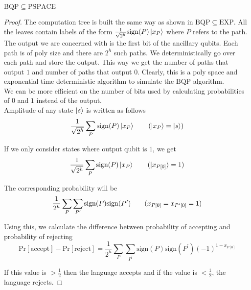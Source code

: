 \documentclass[../main.tex]{subfiles}
\begin{document}
\begin{theorem}
$\mathrm{BQP}\subseteq\mathrm{PSPACE}$ \cite{ADH97}
\end{theorem}
\begin{proof}
The computation tree is built the same way as shown in $\mathrm{BQP}\subseteq\mathrm{EXP}$. All the leaves contain labels of the form $\frac{1}{\sqrt{2^h}}\mathrm{sign}(P)\ket{x_P}$ where $P$ refers to the path.\\

\noindent The output we are concerned with is the first bit of the ancillary qubits. Each path is of poly size and there are $2^h$ such paths. We deterministically go over each path and store the output. This way we get the number of paths that output $1$ and number of paths that output $0$. Clearly, this is a poly space and exponential time deterministic algorithm to simulate the $\mathrm{BQP}$ algorithm.\\

\noindent We can be more efficient on the number of bits used by calculating probabilities of $0$ and $1$ instead of the output.\\

\noindent Amplitude of any state $\ket{s}$ is written as follows
\begin{equation*}
    \frac{1}{\sqrt{2^h}}\sum_P\mathrm{sign}(P)\ket{x_P} \tag{$\ket{x_P} = \ket{s}$}
\end{equation*}

\noindent If we only consider states where output qubit is $1$, we get
\begin{equation*}
    \frac{1}{\sqrt{2^h}}\sum_P\mathrm{sign}(P)\ket{x_P} \tag{$\ket{x_{P[0]}} = 1$}
\end{equation*}

\noindent The corresponding probability will be
\begin{equation*}
    \frac{1}{2^h}\sum_P\sum_{P^\prime}\mathrm{sign}(P)\mathrm{sign}(P^\prime)\tag{$x_{P[0]}=x_{P^\prime[0]}=1$}
\end{equation*}

\noindent Using this, we calculate the difference between probability of accepting and probability of rejecting
\begin{equation*}
    \mathrm{Pr[accept]}-\mathrm{Pr[reject]} = \frac{1}{2^h}\sum_P\sum_{P^\prime}\mathrm{sign}(P)\mathrm{sign}(P^\prime)(-1)^{1-x_{P[0]}}
\end{equation*}

\noindent If this value is $>\frac{1}{2}$ then the language accepts and if the value is $<\frac{1}{2}$, the language rejects.
\end{proof}
\end{document}
